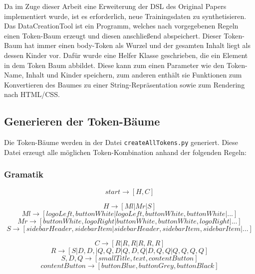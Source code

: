 \documentclass[pdftex,a4paper,halfparskip, article]{scrartcl}
\begin{document}
Da im Zuge dieser Arbeit eine Erweiterung der DSL des Original Papers implementiert wurde, ist es erforderlich, neue Trainingsdaten zu synthetisieren. Das DataCreationTool ist ein Programm, welches nach vorgegebenen Regeln einen Token-Baum erzeugt und diesen anschließend abspeichert. Dieser Token-Baum hat immer einen body-Token als Wurzel und der gesamten Inhalt liegt als dessen Kinder vor. Dafür wurde eine Helfer Klasse geschrieben, die ein Element in dem Token Baum abbildet. Diese kann zum einen Parameter wie den Token-Name, Inhalt und Kinder speichern, zum anderen enthält sie Funktionen zum Konvertieren des Baumes zu einer String-Repräsentation sowie zum Rendering nach HTML/CSS. 

\subsection{Generieren der Token-Bäume}
Die Token-Bäume werden in der Datei \texttt{createAllTokens.py} generiert. Diese Datei erzeugt alle möglichen Token-Kombination anhand der folgenden Regeln:

\subsubsection{Gramatik}

\begin{equation}
start \rightarrow [H,C]
\end{equation}

\begin{equation}
H \rightarrow [Ml | Mr | S]
\end{equation}
\begin{equation}
Ml \rightarrow  [ logoLeft, buttonWhite | logoLeft, buttonWhite, buttonWhite | ...]
\end{equation}
\begin{equation}
Mr \rightarrow [buttonWhite, logoRight | buttonWhite, buttonWhite, logoRight | ...]
\end{equation}
\begin{equation}
S \rightarrow [sidebarHeader, sidebarItem| sidebarHeader, sidebarItem, sidebarItem | ...]
\end{equation}

\begin{equation}
C \rightarrow [R | R, R | R, R, R ]
\end{equation}
\begin{equation}
R \rightarrow [S | D, D, | Q, Q, D | Q, D, Q | D, Q, Q | Q, Q, Q, Q]
\end{equation}
\begin{equation}
S, D, Q \rightarrow [smallTitle, text, contentButton]
\end{equation}
\begin{equation}
contentButton \rightarrow [buttonBlue, buttonGrey, buttonBlack]
\end{equation}
\end{document}
